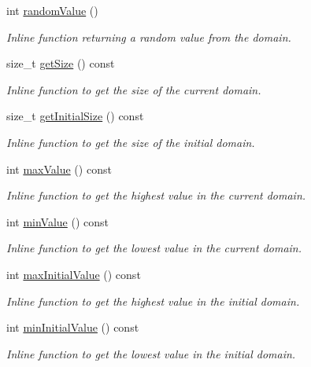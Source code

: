 \begin{DoxyCompactItemize}
int \hyperlink{classghost_1_1Domain_ae2ab236c8382d3f541d0f4db44d2b625}{random\-Value} ()
\begin{DoxyCompactList}\small\item\em Inline function returning a random value from the domain. \end{DoxyCompactList}\item 
size\-\_\-t \hyperlink{classghost_1_1Domain_ac84d289fcf22d1d67e545389e7a9de84}{get\-Size} () const 
\begin{DoxyCompactList}\small\item\em Inline function to get the size of the current domain. \end{DoxyCompactList}\item 
size\-\_\-t \hyperlink{classghost_1_1Domain_a4ecdf5fbb8fb13e3b4c74f51aecf38f5}{get\-Initial\-Size} () const 
\begin{DoxyCompactList}\small\item\em Inline function to get the size of the initial domain. \end{DoxyCompactList}\item 
int \hyperlink{classghost_1_1Domain_a1c62e66fb56efc0586e81cc8ea203dc7}{max\-Value} () const 
\begin{DoxyCompactList}\small\item\em Inline function to get the highest value in the current domain. \end{DoxyCompactList}\item 
int \hyperlink{classghost_1_1Domain_a3c407e59963930f82c17b04d784df0f6}{min\-Value} () const 
\begin{DoxyCompactList}\small\item\em Inline function to get the lowest value in the current domain. \end{DoxyCompactList}\item 
int \hyperlink{classghost_1_1Domain_ac05fdbbd6124f557fd4806efedd0fc83}{max\-Initial\-Value} () const 
\begin{DoxyCompactList}\small\item\em Inline function to get the highest value in the initial domain. \end{DoxyCompactList}\item 
int \hyperlink{classghost_1_1Domain_a82507f2d7e9077e7bd00b88c5ff99c5f}{min\-Initial\-Value} () const 
\begin{DoxyCompactList}\small\item\em Inline function to get the lowest value in the initial domain. \end{DoxyCompactList}\item 

\end{DoxyCompactItemize}
